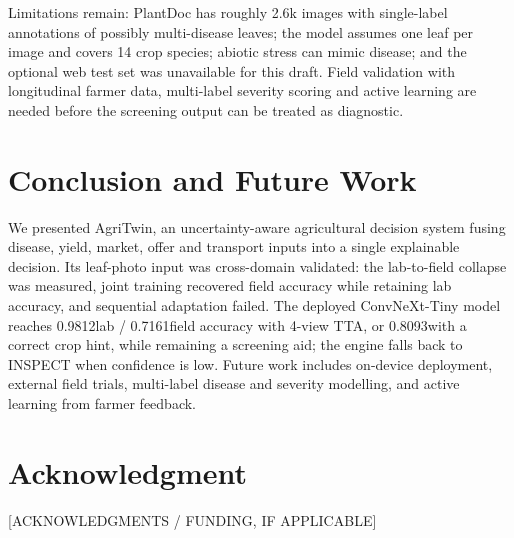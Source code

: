 \documentclass[journal,twocolumn,10pt]{IEEEtran}
\newcommand{\PVvthree}{0.9812}
\newcommand{\PDvthree}{0.7161}
\newcommand{\PDprior}{0.8093}
\begin{document}
Limitations remain: PlantDoc has roughly 2.6k images with single-label annotations of possibly
multi-disease leaves; the model assumes one leaf per image and covers 14 crop species; abiotic
stress can mimic disease; and the optional web test set was unavailable for this draft. Field
validation with longitudinal farmer data, multi-label severity scoring and active learning are
needed before the screening output can be treated as diagnostic.

\section{Conclusion and Future Work}

We presented AgriTwin, an uncertainty-aware agricultural decision system fusing disease, yield,
market, offer and transport inputs into a single explainable decision. Its leaf-photo input was
cross-domain validated: the lab-to-field collapse was measured, joint training recovered field
accuracy while retaining lab accuracy, and sequential adaptation failed. The deployed ConvNeXt-Tiny
model reaches \PVvthree lab / \PDvthree field accuracy with 4-view TTA, or \PDprior with a correct
crop hint, while remaining a screening aid; the engine falls back to INSPECT when confidence is low.
Future work includes
on-device deployment, external field trials, multi-label disease and severity modelling, and
active learning from farmer feedback.

\section*{Acknowledgment}
[ACKNOWLEDGMENTS / FUNDING, IF APPLICABLE]



\end{document}
